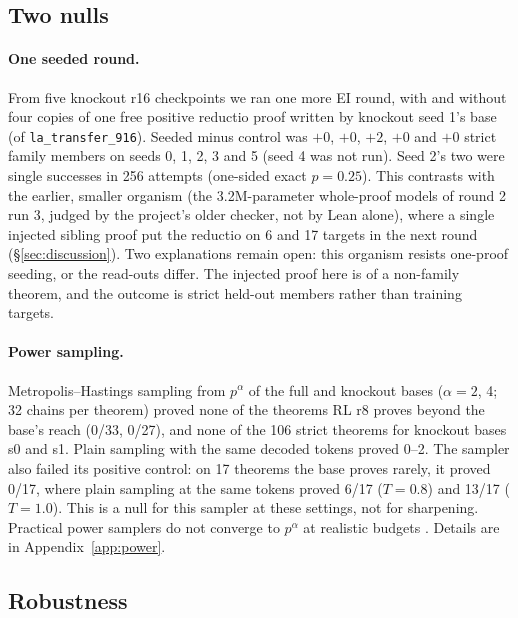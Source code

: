 \subsection{Two nulls}
\label{sec:nulls}

\paragraph{One seeded round.} From five knockout r16 checkpoints we ran one more EI round, with and without four copies of
one free positive reductio proof written by knockout seed 1's base (of \texttt{la\_transfer\_916}). Seeded minus control
was $+0$, $+0$, $+2$, $+0$ and $+0$ strict family members on seeds 0, 1, 2, 3 and 5 (seed 4 was not run). Seed 2's two
were single successes in 256 attempts (one-sided exact $p = 0.25$). This contrasts with the earlier, smaller organism
\rv{} (the 3.2M-parameter whole-proof models of round 2 run 3, judged by the project's older checker, not by Lean alone),
where a single injected sibling proof put the reductio on 6 and 17 targets in the next round
(\S\ref{sec:discussion}). Two explanations remain open: this organism resists one-proof seeding, or the read-outs
differ. The injected proof here is of a non-family theorem, and the outcome is strict held-out members rather than
training targets.

\paragraph{Power sampling.} Metropolis--Hastings sampling from $p^\alpha$ of the full and knockout bases
\citep{karan2025power} ($\alpha = 2$, 4; 32 chains per theorem) proved none of the theorems RL r8 proves beyond the base's
reach (0/33, 0/27), and none of the 106 strict theorems for knockout bases s0 and s1. Plain sampling with the same decoded
tokens proved 0--2. The sampler also failed its positive control: on 17 theorems the base proves rarely, it proved 0/17,
where plain sampling at the same tokens proved 6/17 ($T=0.8$) and 13/17 ($T=1.0$). This is a null for this sampler at
these settings, not for sharpening. Practical power samplers do not converge to $p^\alpha$ at realistic budgets
\citep{talwar2026power}. Details are in Appendix~\ref{app:power}.

\subsection{Robustness}
\label{sec:robust}

